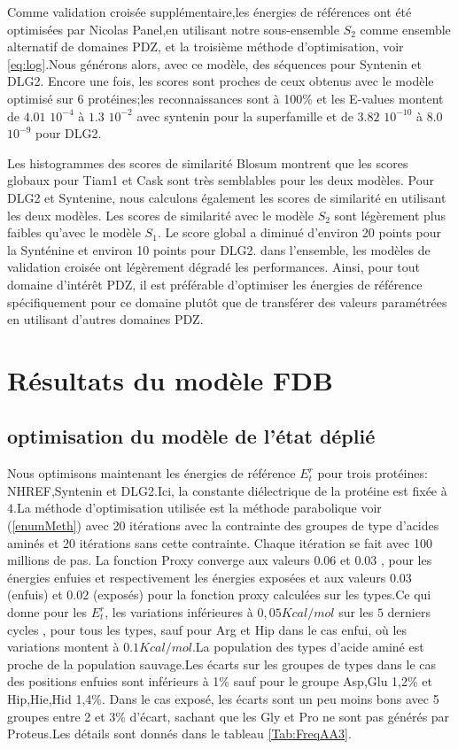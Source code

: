 Comme validation croisée supplémentaire,les énergies de références ont été optimisées par Nicolas Panel,en utilisant notre sous-ensemble $S_2$ comme ensemble alternatif de domaines PDZ, et la troisième méthode d'optimisation, voir \ref{eq:log}.Nous générons alors, avec ce modèle, des séquences pour Syntenin et DLG2.
Encore une fois, les scores sont proches de ceux obtenus avec le modèle optimisé sur 6 protéines;les reconnaissances sont à 100\% et les E-values montent de $4.01$ $10^{-4}$  à $1.3$ $10^{-2}$  avec syntenin pour la superfamille et de $3.82$ $10^{-10}$  à $8.0$ $10^{-9}$ pour DLG2.

Les histogrammes des scores de similarité Blosum montrent que les scores globaux pour Tiam1 et Cask sont très semblables pour les deux modèles. Pour DLG2 et Syntenine, nous calculons également les scores de similarité en utilisant les deux modèles. Les scores de similarité avec le modèle $S_2$  sont légèrement plus faibles qu'avec le  modèle $S_1$. Le score global a diminué d'environ 20 points pour la Synténine et environ 10 points pour DLG2. dans l'ensemble, les modèles de validation croisée ont légèrement dégradé les performances. Ainsi, pour tout domaine d'intérêt PDZ, il est préférable d'optimiser les énergies de référence spécifiquement pour ce domaine plutôt que de transférer des valeurs paramétrées en utilisant d'autres domaines PDZ. 

\section{Résultats du modèle FDB}

\subsection{optimisation du modèle de l'état déplié}

Nous optimisons maintenant les énergies de référence $E_t^r$ pour trois protéines: NHREF,Syntenin et DLG2.Ici, la constante diélectrique de la protéine est fixée à $4$.La méthode d'optimisation utilisée est la méthode parabolique voir (\ref{enumMeth}) avec 20 itérations avec la contrainte des groupes de type d'acides aminés et 20 itérations sans cette contrainte. Chaque itération se fait avec 100 millions de pas. La fonction Proxy converge aux valeurs $0.06$ et $0.03$ , pour les énergies enfuies et respectivement les énergies exposées et aux valeurs $0.03$ (enfuis) et $0.02$ (exposés) pour la fonction proxy calculées sur les types.Ce qui donne pour les $E_t^r$, les variations inférieures à $0,05 Kcal/mol$ sur les $5$ derniers cycles , pour tous les types, sauf pour Arg et Hip dans le cas enfui, où les variations montent à $0.1 Kcal/mol$.La population des types d'acide aminé est proche de la population sauvage.Les écarts sur les groupes de types dans le cas des positions enfuies sont inférieurs à 1\%  sauf pour le groupe {Asp,Glu} 1,2\%  et {Hip,Hie,Hid} 1,4\%. Dans le cas exposé, les écarts sont un peu moins bons avec 5 groupes entre 2 et 3\% d'écart, sachant que les Gly et Pro ne sont pas générés par Proteus.Les détails sont donnés dans le tableau \ref{Tab:FreqAA3}.


